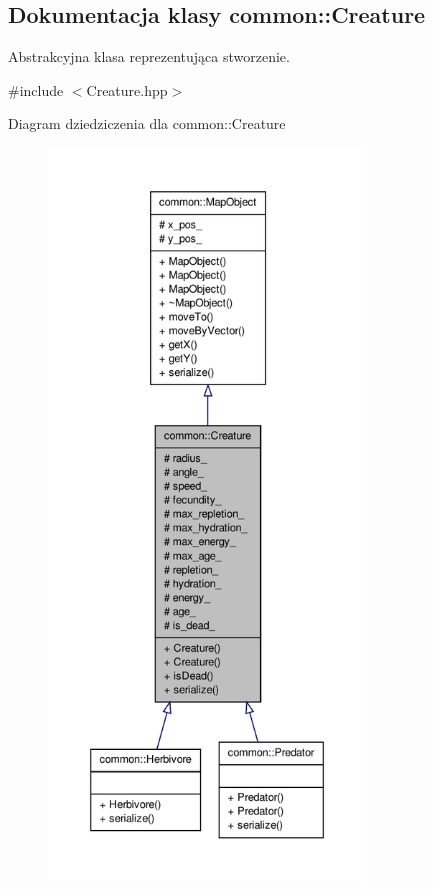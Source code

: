 \hypertarget{classcommon_1_1Creature}{\subsection{Dokumentacja klasy common\-:\-:Creature}
\label{classcommon_1_1Creature}
}


Abstrakcyjna klasa reprezentująca stworzenie.  




{\ttfamily \#include $<$Creature.\-hpp$>$}



Diagram dziedziczenia dla common\-:\-:Creature
\nopagebreak
\begin{figure}[H]
\begin{center}
\leavevmode
\includegraphics[height=550pt]{classcommon_1_1Creature__inherit__graph}
\end{center}
\end{figure}


